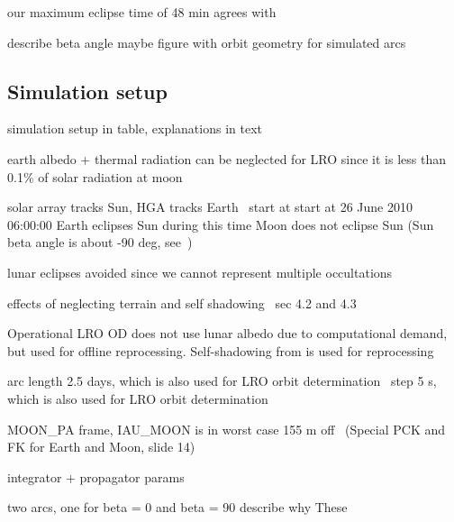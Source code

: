 our maximum eclipse time of 48 min agrees with \cite{Tooley2010}

describe beta angle
maybe figure with orbit geometry for simulated arcs


\subsection{Simulation setup}

simulation setup in table, explanations in text

earth albedo + thermal radiation can be neglected for LRO since it is less than 0.1\% of solar radiation at moon

solar array tracks Sun, HGA tracks Earth~\cite{Tooley2010}
start at start at 26 June 2010 06:00:00
Earth eclipses Sun during this time
Moon does not eclipse Sun (Sun beta angle is about -90 deg, see~\cite{Tooley2010})

lunar eclipses avoided since we cannot represent multiple occultations

effects of neglecting terrain and self shadowing~\cite{Mazarico2018} sec 4.2 and 4.3


Operational LRO OD does not use lunar albedo due to computational demand, but used for offline reprocessing.
Self-shadowing from \citeauthor{Mazarico2009} is used for reprocessing~\cite{Nicholson2010}

arc length 2.5 days, which is also used for LRO orbit determination~\cite{Mazarico2011}
step 5 s, which is also used for LRO orbit determination~\cite{Mazarico2018}

MOON\_PA frame, IAU\_MOON is in worst case 155 m off~\cite{NAIF2020} (Special PCK and FK for Earth and Moon, slide 14)

integrator + propagator params



two arcs, one for beta = 0 and beta = 90
describe why These